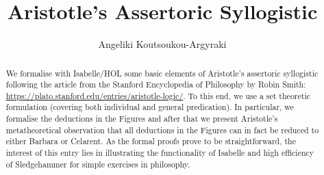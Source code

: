 \documentclass[11pt,a4paper]{article}
\begin{document}
\title{Aristotle's Assertoric Syllogistic}
\author{Angeliki Koutsoukou-Argyraki}
\maketitle

\begin{abstract}
	We formalise with Isabelle/HOL some basic elements of Aristotle's assertoric syllogistic following
	the article from the Stanford Encyclopedia of Philosophy by Robin Smith:
	\url{https://plato.stanford.edu/entries/aristotle-logic/}.
	To this end, we use a set theoretic formulation (covering both individual and general predication).
	In particular, we formalise the deductions in the Figures and after that we present Aristotle's
	metatheoretical observation that all deductions in the Figures can in fact be reduced to either
	Barbara or Celarent. As the formal proofs prove to be straightforward, the interest of this entry 
	lies in illustrating the functionality of Isabelle and high efficiency of Sledgehammer for simple 
	exercises in philosophy.
\end{abstract}

\tableofcontents



%
%
\end{document}
